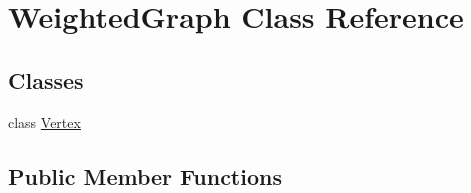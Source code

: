 \hypertarget{class_weighted_graph}{\section{Weighted\+Graph Class Reference}
\label{class_weighted_graph}
}
\subsection*{Classes}
\begin{DoxyCompactItemize}
\item 
class \hyperlink{class_weighted_graph_1_1_vertex}{Vertex}
\end{DoxyCompactItemize}
\subsection*{Public Member Functions}
